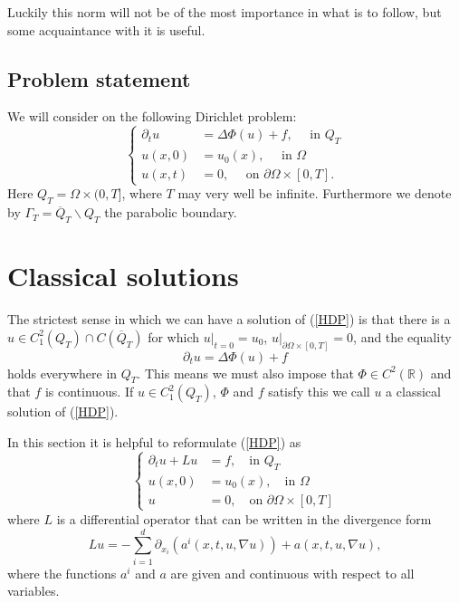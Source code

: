 \documentclass[11pt, a4paper]{article}
\begin{document}
Luckily this norm will not be of the most importance in what is to follow, but some acquaintance with it is useful.

 
 
\subsection{Problem statement}
We will consider on the following Dirichlet problem:
\begin{equation}
\label{HDP}
	\begin{cases}
		\partial_t u &= \Delta \Phi(u) + f, \quad \text{ in } Q_T \\
		u(x,0) &= u_0(x), \quad \text{ in } \Omega \\
		u(x,t) &= 0, \quad \text{ on } \partial\Omega \times [0,T].
	\end{cases}
\end{equation}
Here $Q_T = \Omega \times (0,T]$, where $T$ may very well be infinite. Furthermore we denote by $\Gamma_T = \overline{Q}_T\backslash Q_T$ the parabolic boundary.



\section{Classical solutions}
The strictest sense in which we can have a solution of (\ref{HDP}) is that there is a $u \in C^2_1(Q_T)\cap C(\overline{Q}_T)$ for which $u\big|_{t=0} = u_0$,  $u\big|_{\partial\Omega \times [0,T]} = 0$, and the equality
\begin{equation*}
\partial_t u = \Delta \Phi(u) + f
\end{equation*}
holds everywhere in $Q_T$. This means we must also impose that $\Phi \in C^2(\mathbb{R})$ and that $f$ is continuous. If $u \in C^2_1(Q_T)$, $\Phi$ and $f$ satisfy this we call $u$ a classical solution of (\ref{HDP}).


In this section it is helpful to reformulate (\ref{HDP}) as 
\begin{equation}
\label{general_parabolic_problem}
	\begin{cases}
		\partial_t u + Lu &= f, \quad \text{in } Q_T \\
		u(x,0) &= u_0(x), \quad \text{in } \Omega \\
		u &= 0, \quad \text{on } \partial \Omega \times [0,T]
	\end{cases}
\end{equation}
where $L$ is a differential operator that can be written in the divergence form
\begin{equation}
Lu = -\sum_{i=1}^d \partial_{x_i}(a^i(x,t,u,\nabla u)) + a(x,t,u,\nabla u),
\end{equation}
where the functions $a^i$ and $a$ are given and continuous with respect to all variables.
\end{document}
